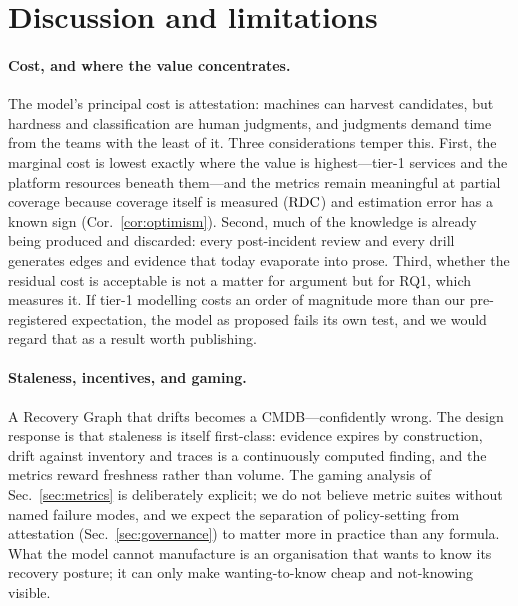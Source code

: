 \section{Discussion and limitations}
\label{sec:discussion}

\paragraph{Cost, and where the value concentrates.}
The model's principal cost is attestation: machines can harvest candidates, but hardness and classification are human judgments, and judgments demand time from the teams with the least of it. Three considerations temper this. First, the marginal cost is lowest exactly where the value is highest---tier-1 services and the platform resources beneath them---and the metrics remain meaningful at partial coverage because coverage itself is measured ($\mathrm{RDC}$) and estimation error has a known sign (Cor.~\ref{cor:optimism}). Second, much of the knowledge is already being produced and discarded: every post-incident review and every drill generates edges and evidence that today evaporate into prose. Third, whether the residual cost is acceptable is not a matter for argument but for RQ1, which measures it. If tier-1 modelling costs an order of magnitude more than our pre-registered expectation, the model as proposed fails its own test, and we would regard that as a result worth publishing.

\paragraph{Staleness, incentives, and gaming.}
A Recovery Graph that drifts becomes a CMDB---confidently wrong. The design response is that staleness is itself first-class: evidence expires by construction, drift against inventory and traces is a continuously computed finding, and the metrics reward freshness rather than volume. The gaming analysis of Sec.~\ref{sec:metrics} is deliberately explicit; we do not believe metric suites without named failure modes, and we expect the separation of policy-setting from attestation (Sec.~\ref{sec:governance}) to matter more in practice than any formula. What the model cannot manufacture is an organisation that wants to know its recovery posture; it can only make wanting-to-know cheap and not-knowing visible.

